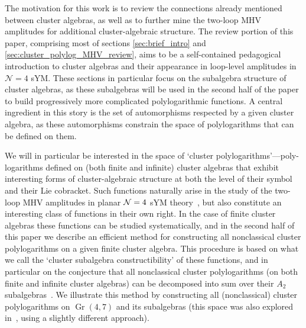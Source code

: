 \documentclass[12pt]{article}
\DeclareMathOperator{\Gr}{Gr}
\begin{document}
The motivation for this work is to review the connections already mentioned between cluster algebras, as well as to further mine the two-loop MHV amplitudes for additional cluster-algebraic structure. The review portion of this paper, comprising most of sections \ref{sec:brief_intro} and \ref{sec:cluster_polylog_MHV_review}, aims to be a self-contained pedagogical introduction to cluster algebras and their appearance in loop-level amplitudes in $\mathcal{N}=4$ sYM. These sections in particular focus on the subalgebra structure of cluster algebras, as these subalgebras will be used in the second half of the paper to build progressively more complicated polylogarithmic functions. A central ingredient in this story is the set of automorphisms respected by a given cluster algebra, as these automorphisms constrain the space of polylogarithms that can be defined on them.

We will in particular be interested in the space of `cluster polylogarithms'---poly- logarithms defined on (both finite and infinite) cluster algebras that exhibit interesting forms of cluster-algebraic structure at both the level of their symbol and their Lie cobracket. Such functions naturally arise in the study of the two-loop MHV amplitudes in planar ${\cal N} =4$ sYM theory~\cite{Golden:2014xqa}, but also constitute an interesting class of functions in their own right. In the case of finite cluster algebras these functions can be studied systematically, and in the second half of this paper we describe an efficient method for constructing all nonclassical cluster polylogarithms on a given finite cluster algebra. This procedure is based on what we call the `cluster subalgebra constructibility' of these functions, and in particular on the conjecture that all nonclassical cluster polylogarithms (on both finite and infinite cluster algebras) can be decomposed into sum over their $A_2$ subalgebras~\cite{Golden:2014xqa}. We illustrate this method by constructing all (nonclassical) cluster polylogarithms on $\Gr(4,7)$ and its subalgebras (this space was also explored in~\cite{Harrington:2015bdt}, using a slightly different approach).
\end{document}
